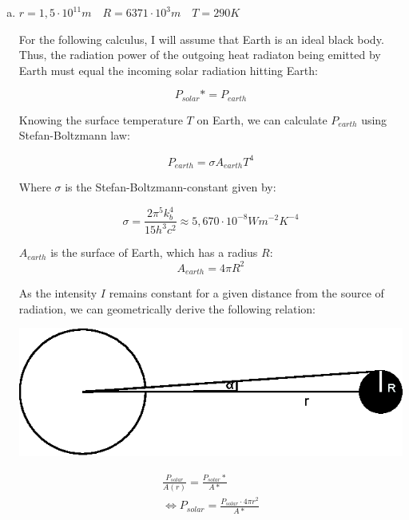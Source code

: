 \documentclass[a4paper,german,12pt]{scrartcl}
\begin{document}
\begin{enumerate}[(a)]
\item $r=1,5\cdot 10^{11}m \quad R=6371\cdot 10^3m \quad T=290K$

For the following calculus, I will assume that Earth is an ideal black body. Thus, the radiation power of the outgoing heat radiaton being emitted by Earth must equal the incoming solar radiation hitting Earth:

\begin{equation*}
P_{solar}*=P_{earth}
\end{equation*}

Knowing the surface temperature $T$ on Earth, we can calculate $P_{earth}$ using Stefan-Boltzmann law:

\begin{equation*}
P_{earth}=\sigma A_{earth} T^4
\end{equation*}

Where $\sigma$ is the Stefan-Boltzmann-constant given by:

\begin{equation*}
\sigma = \frac{2\pi^5k_b^4}{15h^3c^2} \approx 5,670\cdot 10^{-8}Wm^{-2}K^{-4} 
\end{equation*}

$A_{earth}$ is the surface of Earth, which has a radius $R$:
\begin{equation*}
A_{earth} = 4\pi R^2
\end{equation*}

As the intensity $I$ remains constant for a given distance from the source of radiation, we can geometrically derive the following relation:

\begin{center}
\includegraphics{sketch1.eps}
\end{center}

\begin{align*}
\frac{P_{solar}}{A(r)}=\frac{P_{solar}*}{A*}\\
\Leftrightarrow P_{solar}=\frac{P_{solar}\cdot 4\pi r^2}{A*}
\end{align*}


\end{enumerate}
\end{document}
